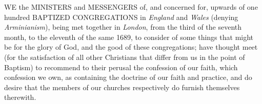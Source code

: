 \documentclass[
    paper=letterpaper,
    11pt,
    twoside,
    DIV=calc,
    openany
]{scrbook}
\newcommand{\mynote}[1]{}
\begin{document}
\footnotebegin
{}
\footnoteend



\pagebreak
{}
WE the MINISTERS and MESSENGERS of, and concerned for, upwards of one hundred BAPTIZED CONGREGATIONS in \textit{England} and \textit{Wales} (denying \textit{Arminianism}\mynote{A system of doctrine taught by Jacobus Arminius (1560-1609), Dutch theologian. He rejected the Reformers’ understanding of salvation by God’s sovereign election, teaching instead that God’s election of individuals was based on His foreknowledge of their accepting or rejecting Christ by their own free will}), being met together in \textit{London}, from the third of the seventh month, to the eleventh of the same 1689, to consider of some things that might be for the glory of God, and the good of these congregations; have thought meet (for the satisfaction of all other Christians that differ from us in the point of Baptism) to recommend to their perusal the confession of our faith, which confession we own, as containing the doctrine of our faith and practice, and do desire that the members of our churches respectively do furnish themselves therewith.
\end{document}
